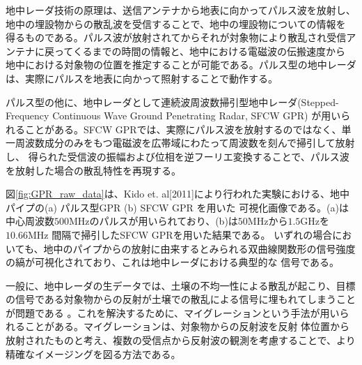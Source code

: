 \documentclass[11pt,a4paper,uplatex]{ujarticle}
\begin{document}
    地中レーダ技術の原理は、送信アンテナから地表に向かってパルス波を放射し、地中の埋設物からの散乱波を受信することで、地中の埋設物についての情報を
    得るものである。パルス波が放射されてからそれが対象物により散乱され受信アンテナに戻ってくるまでの時間の情報と、地中における電磁波の伝搬速度から
    地中における対象物の位置を推定することが可能である。パルス型の地中レーダは、実際にパルスを地表に向かって照射することで動作する。

    パルス型の他に、地中レーダとして連続波周波数掃引型地中レーダ(Stepped-Frequency Continuous Wave Ground Penetrating Radar, SFCW GPR)
    が用いられることがある。SFCW GPRでは、実際にパルス波を放射するのではなく、単一周波数成分のみをもつ電磁波を広帯域にわたって周波数を刻んで掃引して放射し、
    得られた受信波の振幅および位相を逆フーリエ変換することで、パルス波を放射した場合の散乱特性を再現する\cite{stepped_frequency_continuous_wave}。

    図\ref{fig:GPR_raw_data}は、Kido et. al[2011]により行われた実験\cite{STFW_Kido}における、地中パイプの(a) パルス型GPR (b) SFCW GPR を用いた
    可視化画像である。(a)は中心周波数$500\mathrm{MHz}$のパルスが用いられており、(b)は$50\mathrm{MHz}$から$1.5\mathrm{GHz}$を$10.66\mathrm{MHz}$
    間隔で掃引したSFCW GPRを用いた結果である。
    いずれの場合においても、地中のパイプからの放射に由来するとみられる双曲線関数形の信号強度の縞が可視化されており、これは地中レーダにおける典型的な
    信号である。

    一般に、地中レーダの生データでは、土壌の不均一性による散乱が起こり、目標の信号である対象物からの反射が土壌での散乱による信号に埋もれてしまうことが問題である
    \cite{prestack_migration}。これを解決するために、マイグレーションという手法が用いられることがある。マイグレーションは、対象物からの反射波を反射
    体位置から放射されたものと考え、複数の受信点から反射波の観測を考慮することで、より精確なイメージングを図る方法である\cite{gpr_migration}。
\end{document}
